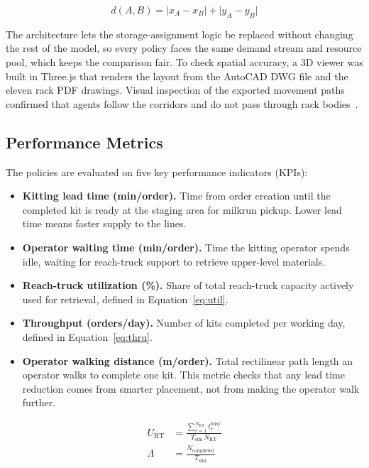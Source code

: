 \documentclass[conference]{IEEEtran}
\begin{document}
\begin{equation}
\label{eq:manhattan}
d(A,B) = \lvert x_A - x_B \rvert + \lvert y_A - y_B \rvert
\end{equation}

The architecture lets the storage-assignment logic be replaced without
changing the rest of the model, so every policy faces the same demand stream
and resource pool, which keeps the comparison fair. To check spatial accuracy,
a 3D viewer was built in Three.js that renders the layout from the AutoCAD DWG
file and the eleven rack PDF drawings. Visual inspection of the exported
movement paths confirmed that agents follow the corridors and do not pass
through rack bodies~\cite{ardiansyah2024,sargent2013}.

\subsection{Performance Metrics}
The policies are evaluated on five key performance indicators (KPIs):
\begin{itemize}
\item \textbf{Kitting lead time (min/order).} Time from order creation until
the completed kit is ready at the staging area for milkrun pickup. Lower lead
time means faster supply to the lines.
\item \textbf{Operator waiting time (min/order).} Time the kitting operator
spends idle, waiting for reach-truck support to retrieve upper-level
materials.
\item \textbf{Reach-truck utilization (\%).} Share of total reach-truck
capacity actively used for retrieval, defined in Equation~\eqref{eq:util}.
\item \textbf{Throughput (orders/day).} Number of kits completed per working
day, defined in Equation~\eqref{eq:thru}.
\item \textbf{Operator walking distance (m/order).} Total rectilinear path
length an operator walks to complete one kit. This metric checks that any lead
time reduction comes from smarter placement, not from making the operator walk
further.
\end{itemize}

\begin{align}
U_{\mathrm{RT}} &= \frac{\sum_{r=1}^{N_{\mathrm{RT}}} t^{\mathrm{busy}}_r}
{T_{\mathrm{sim}}\, N_{\mathrm{RT}}} \label{eq:util}\\[2pt]
\Lambda &= \frac{N_{\mathrm{completed}}}{T_{\mathrm{sim}}} \label{eq:thru}
\end{align}
\end{document}
